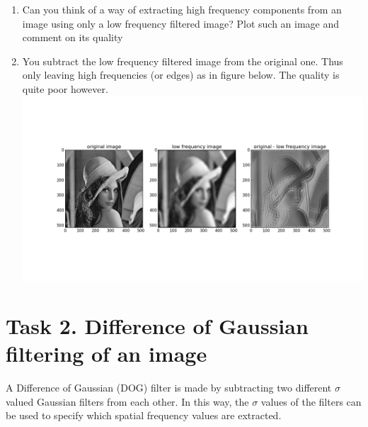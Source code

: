 \documentclass[12pt,english]{scrartcl}
\begin{document}
\begin{enumerate}
 \color{black}
 \raggedright
 \item Can you think of a way of extracting high frequency components from an image using only a low frequency filtered image? Plot such an image and comment on its quality \\
 \item[]
 \color{blue}
You subtract the low frequency filtered image from the original one. Thus only leaving high frequencies (or edges) as in figure below. The quality is quite poor however. \\
 \centering
 \includegraphics[scale=0.4]{task_1_3.png} 
 
 \end{enumerate}


\section*{Task 2. Difference of Gaussian filtering of an image}
A Difference of Gaussian (DOG) filter is made by subtracting two different $\sigma$ valued Gaussian filters from each other. In this way, the $\sigma$ values of the filters can be used to specify which spatial frequency values are extracted.
\end{document}
